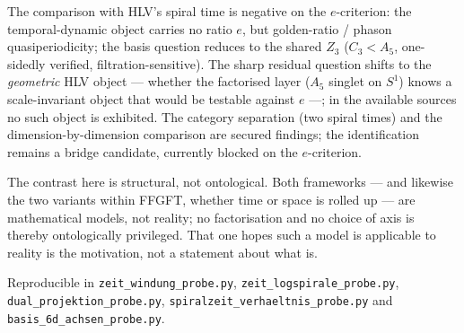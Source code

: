 The comparison with HLV's spiral time is negative on the $e$-criterion: the temporal-dynamic object
carries no ratio $e$, but golden-ratio / phason quasiperiodicity; the basis question reduces to the
shared $Z_3$ ($C_3<A_5$, one-sidedly verified, filtration-sensitive). The sharp residual question
shifts to the \emph{geometric} HLV object --- whether the factorised layer ($A_5$ singlet on $S^1$)
knows a scale-invariant object that would be testable against $e$ ---; in the available sources no
such object is exhibited. The category separation (two spiral times) and the dimension-by-dimension
comparison are secured findings; the identification remains a bridge candidate, currently blocked on
the $e$-criterion.

The contrast here is structural, not ontological. Both frameworks --- and likewise the two variants
within FFGFT, whether time or space is rolled up --- are mathematical models, not reality; no
factorisation and no choice of axis is thereby ontologically privileged. That one hopes such a
model is applicable to reality is the motivation, not a statement about what is.

Reproducible in \texttt{zeit\_windung\_probe.py}, \texttt{zeit\_logspirale\_probe.py},
\texttt{dual\_projektion\_probe.py}, \texttt{spiralzeit\_verhaeltnis\_probe.py} and
\texttt{basis\_6d\_achsen\_probe.py}.
